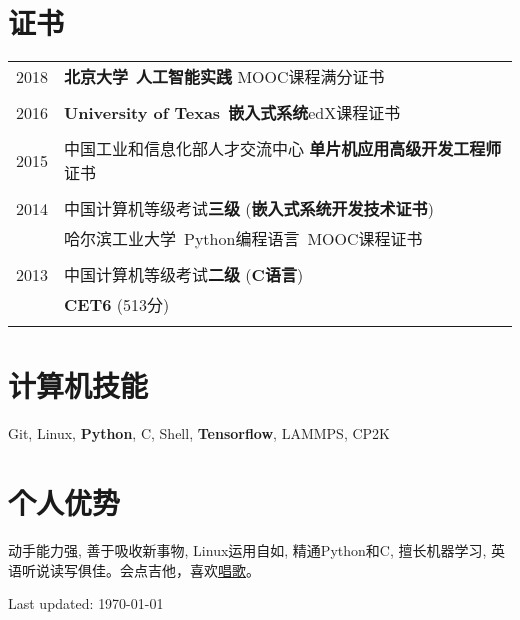 \documentclass[a4paper,10pt]{article} %
\begin{document}
\section{证书}
\begin{tabular}{r|l}	
2018                        & \textbf{北京大学}\ \textbf{人工智能实践} MOOC课程满分证书\\
\multicolumn{2}{c}{} \\	%

2016                        &  \textbf{University of Texas}\ \textbf{嵌入式系统}edX课程证书 \\   	
\multicolumn{2}{c}{} \\	%

2015                     & 中国工业和信息化部人才交流中心 \textbf{单片机应用高级开发工程师} 证书\\
\multicolumn{2}{c}{} \\	%

2014                     & 中国计算机等级考试\textbf{三级} (\textbf{嵌入式系统开发技术证书})\\
							& 哈尔滨工业大学\ Python编程语言\ MOOC课程证书\\
\multicolumn{2}{c}{} \\	%

2013                     & 中国计算机等级考试\textbf{二级} (\textbf{C语言})\\
& \textbf{CET6} (513分)\\
\multicolumn{2}{c}{} \\	%
\end{tabular}

\section{计算机技能}
\begin{small}
Git, Linux, \textbf{Python}, C, Shell, \textbf{Tensorflow}, LAMMPS, CP2K
\end{small}


\section{个人优势}
动手能力强, 善于吸收新事物, Linux运用自如, 精通Python和C, 擅长机器学习, 英语听说读写俱佳。会点吉他，喜欢\href{https://music.163.com/outchain/player?type=4&id=348244114}{唱歌}。



\begin{flushright} 
Last updated: {\today}
\end{flushright}
\end{document}
